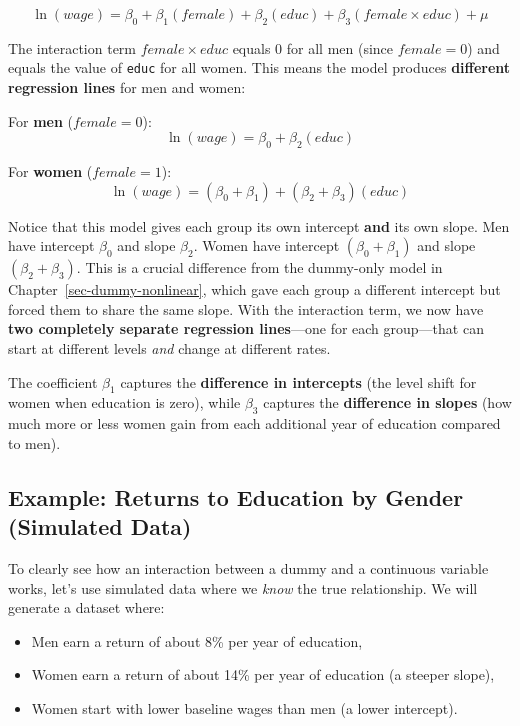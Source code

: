 \documentclass[
  letterpaper,
  DIV=11,
  numbers=noendperiod]{scrreprt}
\providecommand{\tightlist}{%
  \setlength{\itemsep}{0pt}\setlength{\parskip}{0pt}}
\begin{document}
\[
\ln(wage) = \beta_0 + \beta_1(female) + \beta_2(educ) + \beta_3(female \times educ) + \mu
\]

The interaction term \(female \times educ\) equals 0 for all men (since
\(female = 0\)) and equals the value of \texttt{educ} for all women.
This means the model produces \textbf{different regression lines} for
men and women:

For \textbf{men} (\(female = 0\)): \[
\ln(wage) = \beta_0 + \beta_2(educ)
\]

For \textbf{women} (\(female = 1\)): \[
\ln(wage) = (\beta_0 + \beta_1) + (\beta_2 + \beta_3)(educ)
\]

Notice that this model gives each group its own intercept \textbf{and}
its own slope. Men have intercept \(\beta_0\) and slope \(\beta_2\).
Women have intercept \((\beta_0 + \beta_1)\) and slope
\((\beta_2 + \beta_3)\). This is a crucial difference from the
dummy-only model in Chapter~\ref{sec-dummy-nonlinear}, which gave each
group a different intercept but forced them to share the same slope.
With the interaction term, we now have \textbf{two completely separate
regression lines}---one for each group---that can start at different
levels \emph{and} change at different rates.

The coefficient \(\beta_1\) captures the \textbf{difference in
intercepts} (the level shift for women when education is zero), while
\(\beta_3\) captures the \textbf{difference in slopes} (how much more or
less women gain from each additional year of education compared to men).

\subsection{Example: Returns to Education by Gender (Simulated
Data)}\label{example-returns-to-education-by-gender-simulated-data}

To clearly see how an interaction between a dummy and a continuous
variable works, let's use simulated data where we \emph{know} the true
relationship. We will generate a dataset where:

\begin{itemize}
\tightlist
\item
  Men earn a return of about 8\% per year of education,
\item
  Women earn a return of about 14\% per year of education (a steeper
  slope),
\item
  Women start with lower baseline wages than men (a lower intercept).
\end{itemize}
\end{document}
